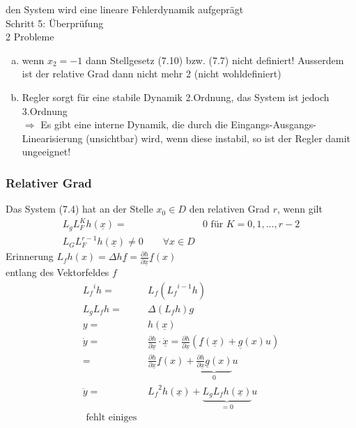 \documentclass[11pt,a4paper]{article}
\begin{document}
den System wird eine lineare Fehlerdynamik aufgeprägt\\
Schritt 5: Überprüfung\\
2 Probleme\\
\begin{enumerate}[a)]
\item wenn $x_2 = -1$ dann Stellgesetz (7.10) bzw. (7.7) nicht definiert! Ausserdem ist der relative Grad dann nicht mehr 2 (nicht wohldefiniert)
\item Regler sorgt für eine stabile Dynamik 2.Ordnung, das System ist jedoch 3.Ordnung\\
$\Rightarrow$ Es gibt eine interne Dynamik, die durch die Eingangs-Ausgangs-Linearisierung (unsichtbar) wird,  wenn diese instabil, so ist der Regler damit ungeeignet!
\end{enumerate}
\subsubsection{Relativer Grad}
Das System (7.4) hat an der Stelle $x_0 \in D$ den relativen Grad $r$, wenn gilt \\
\begin{align*}
L_g L_F ^K h(\underline x)  =& 0 \text{  für  } K= 0,1,\dots, r-2\\
L_G L_F ^{r-1} h(\underline x) \ne 0 \qquad \forall x\in D
\end{align*}
Erinnerung $L_f h(x) = \Delta h \underline f = \frac{\partial h}{\partial \underline x} \underline f(x)$\\
entlang des Vektorfeldes $f$\\
\begin{align*}
{L_f}^i h =& L_f ({L_f}^{i-1} h)\\
L_g L_f h=& \Delta (L_f h )g\\
y =& h(\underline x)\\
\dot y = &\frac{\partial h}{\partial \underline x} \cdot \dot {\underline x} = \frac{\partial h}{\partial \underline x} (\underline f(\underline x) + \underline g(x)u)\\
=&\frac{\partial h}{\partial \underline x}\underline f(x) + \underbrace{\frac{\partial h}{\partial \underline x} \underline g(x)}_{0}u\\
\ddot y=& {L_f}^2 h(\underline x) + \underbrace{L_g L_f h(\underline x)}_{=0} u\\
\text{  fehlt einiges }
\end{align*}
\end{document}
